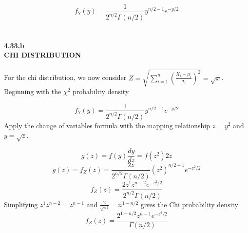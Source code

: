 \documentclass[10pt]{article}
\begin{document}
\[ f_Y(y)=\frac{1}{2^{n/2}\Gamma(n/2)}y^{n/2-1}e^{-y/2} \]
\\
\\


\noindent
{\bf 4.33.b   \\  CHI DISTRIBUTION}
\\
\\

\noindent
For the chi distribution, we now consider 
$ Z=\sqrt{ \sum_{i=1}^{n} (\frac{X_i-\mu_i}{\sigma_i})^2 }=\sqrt{x} $. Beginning with the  $\chi ^2$ probability density

\[ f_Y(y)=\frac{1}{2^{n/2}\Gamma(n/2)}y^{n/2-1}e^{-y/2} \]
Apply the change of variables formula with the mapping relationship $z=y^2$ and $y=\sqrt{z}$.

\[ g(z)=f(y)\frac{dy}{dz}=f(z^2)2z \]
\[ g(z)=f_Z(z)=\frac{2z}{2^{n/2}\Gamma(n/2)}(z^2)^{n/2-1}e^{-z^2/2} \]
\[ f_Z(z)=\frac{2 z^1z^{n-2}e^{-z^2/2}}{2^{n/2}\Gamma(n/2)} \]
Simplifying $z^1z^{n-2}=z^{n-1}$ and $\frac{2}{2^{n/2}}=n^{1-n/2}$ gives the Chi probability density 
\[ f_Z(z)=\frac{2^{1-n/2} z^{n-1}e^{-z^2/2}}{\Gamma(n/2)} \]






\newpage
\end{document}
